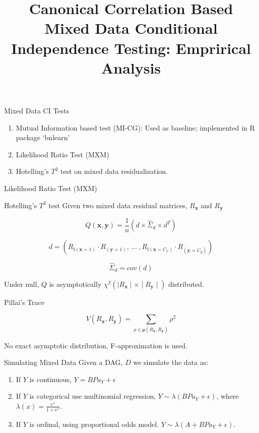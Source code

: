 \documentclass{beamer}
\begin{document}
\title[]{Canonical Correlation Based Mixed Data Conditional Independence Testing: Emprirical Analysis}
\author{}
\date{}

\maketitle

\begin{frame}{Mixed Data CI Tests}
	\begin{enumerate}
		\item Mutual Information based test (MI-CG): Used as baseline; implemented in R package `bnlearn'
		\item Likelihood Ratio Test (MXM)
		\item Hotelling's $T^2$ test on mixed data residualization.
	\end{enumerate}
\end{frame}

\begin{frame}{Likelihood Ratio Test (MXM)}
\end{frame}

\begin{frame}{Hotelling's $ T^2 $ test}
Given two mixed data residual matrices, $ R_\mathbf{x} $ and $ R_\mathbf{y} $

$$ Q(\mathbf{x}, \mathbf{y}) = \frac{1}{n} \left( d \times \hat{\Sigma}_d \times d^T \right) $$


$$
d = (R_{\mathbb{I}(\mathbf{x}=1)} \cdot R_{(\mathbf{y}=1)}, \, \ldots \ ,
R_{\mathbb{I}(\mathbf{x}=C_x)} \cdot R_{(\mathbf{y}=C_y)} )
$$

$$ \hat{\Sigma}_d = cov(d) $$

Under null, $ Q $ is asymptotically $ \chi^2 (\mid R_\mathbf{x} \mid \times \mid R_\mathbf{y} \mid) $ distributed.

\end{frame}

\begin{frame}{Pillai's Trace}

$$ \textit{V}(R_\mathbf{x}, R_\mathbf{y}) = \sum_{\rho \in \bm{\rho}(R_\mathbf{x}, R_\mathbf{y})} \rho^2 $$

No exact asymptotic distribution, F-approximation is used.

\end{frame}

\begin{frame}{Simulating Mixed Data}
	Given a DAG, $ D $ we simulate the data as:
	\begin{enumerate}
		\item If $ Y $ is continuous, $ Y = B Pa_Y + \epsilon $
		\item If $ Y $ is categorical use multinomial regression, $ Y \sim \lambda(B Pa_Y + \epsilon) $, where $ \lambda(x) = \frac{e^x}{1+e^x} $.
		\item If $ Y $ is ordinal, using proportional odds model. $ Y \sim \lambda(A + B Pa_Y + \epsilon) $.
	\end{enumerate}
\end{frame}
\end{document}

